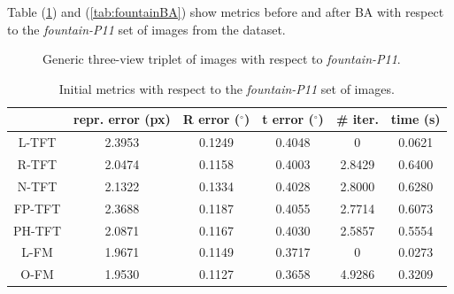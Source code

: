 Table (\ref{tab:fountainInit}) and (\ref{tab:fountainBA}) show metrics before and after \acs{BA} with respect to the \textit{fountain-P11} set of images from the dataset.

\begin{figure}[h]
    \centering
    \caption[\textit{fountain-P11} Triplet]{Generic three-view triplet of images with respect to \textit{fountain-P11}. \cite{13-epfl-dataset}}
    \label{fig:fountainImage}
\end{figure}

\begin{table}[htbp]
  \centering
  \caption[\textit{fountain-P11} Initial Metrics]{Initial metrics with respect to the \textit{fountain-P11} set of images.}
  \label{tab:fountainInit}
  \begin{tabular}{|*{6}{c}|}
    \hline
     & repr. error (px) & R error ($^{\circ}$) & t error ($^{\circ}$) & \# iter. & time (s)\\
    \hline
    \acs{L-TFT} & 2.3953 & 0.1249 & 0.4048 & 0 & 0.0621 \\
    \acs{R-TFT} & 2.0474 & 0.1158 & 0.4003 & 2.8429 & 0.6400 \\
    \acs{N-TFT} & 2.1322 & 0.1334 & 0.4028 & 2.8000 & 0.6280 \\
    \acs{FP-TFT} & 2.3688 & 0.1187 & 0.4055 & 2.7714 & 0.6073 \\
    \acs{PH-TFT} & 2.0871 & 0.1167 & 0.4030 & 2.5857 & 0.5554 \\
    \acs{L-FM} & 1.9671 & 0.1149 & 0.3717 & 0 & 0.0273 \\
    \acs{O-FM} & 1.9530 & 0.1127 & 0.3658 & 4.9286 & 0.3209 \\
    \hline
  \end{tabular}
\end{table}

